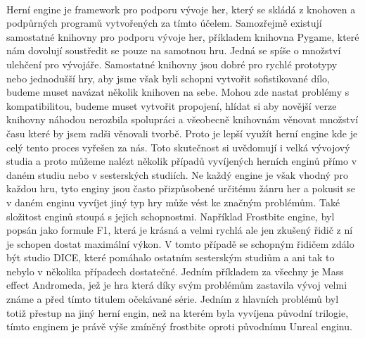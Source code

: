 \paragraph{}
	Herní engine je framework pro podporu vývoje her, který se skládá z knohoven a podpůrných programů vytvořených za tímto účelem.
	Samozřejmě existují samostatné knihovny pro podporu vývoje her, příkladem knihovna Pygame\cite{pygame}, které nám dovolují soustředit se pouze na samotnou hru.
	Jedná se spíše o množství ulehčení pro vývojáře.
	Samostatné knihovny jsou dobré pro rychlé prototypy nebo jednodušší hry, aby jsme však byli schopni vytvořit sofistikované dílo, budeme muset navázat několik knihoven na sebe.
	Mohou zde nastat problémy s kompatibilitou, budeme muset vytvořit propojení, hlídat si aby novější verze knihovny náhodou nerozbila spolupráci a všeobecně knihovnám věnovat množství času které by jsem radši věnovali tvorbě.
	Proto je lepší využít herní engine kde je celý tento proces vyřešen za nás.
	Toto skutečnost si uvědomují i velká vývojový studia a proto můžeme nalézt několik případů vyvíjených herních enginů přímo v daném studiu nebo v sesterských studiích.
	Ne každý engine je však vhodný pro každou hru, tyto enginy jsou často přizpůsobené určitému žánru her a pokusit se v daném enginu vyvíjet jiný typ hry může vést ke značným problémům.
	Také složitost enginů stoupá s jejich schopnostmi.
	Například Frostbite engine\cite{frostbite}, byl popsán jako formule F1, která je krásná a velmi rychlá ale jen zkušený řidič z ní je schopen dostat maximální výkon\cite{frostbite_article}.
	V tomto případě se schopným řidičem zdálo být studio DICE, které pomáhalo ostatním sesterským studiům a ani tak to nebylo v několika případech dostatečné.
	Jedním příkladem za všechny je Mass effect Andromeda\cite{mass_effect_andromeda}, jež je hra která díky svým problémům zastavila vývoj velmi známe a před tímto titulem očekávané série.
	Jedním z hlavních problémů byl totiž přestup na jiný herní engin, než na kterém byla vyvíjena původní trilogie, tímto enginem je právě výše zmíněný frostbite oproti původnímu Unreal enginu\cite{unreal_engine}.

